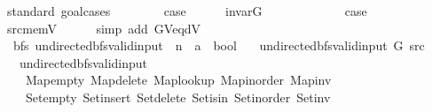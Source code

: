 \begin{isabellebody}
\isamarkupfalse%
\ {\isacharparenleft}{\kern0pt}standard{\isacharcomma}{\kern0pt}\ goal{\isacharunderscore}{\kern0pt}cases{\isacharparenright}{\kern0pt}\isanewline
\ \ \isamarkupfalse%
\ {}\isanewline
\ \ \isamarkupfalse%
\ {\isacharquery}{\kern0pt}case\isanewline
\ \ \ \ \isamarkupfalse%
\ invar{\isacharunderscore}{\kern0pt}G\isanewline
\ \ \ \ \isacommand{{\isachardot}{\kern0pt}}\isamarkupfalse%
\isanewline
{}\isamarkupfalse%
\isanewline
\ \ \isamarkupfalse%
\ {}\isanewline
\ \ \isamarkupfalse%
\ {\isacharquery}{\kern0pt}case\isanewline
\ \ \ \ \isamarkupfalse%
\ src{\isacharunderscore}{\kern0pt}mem{\isacharunderscore}{\kern0pt}V\isanewline
\ \ \ \ \isamarkupfalse%
\ {\isacharparenleft}{\kern0pt}simp\ add{\isacharcolon}{\kern0pt}\ G{\isachardot}{\kern0pt}V{\isacharunderscore}{\kern0pt}eq{\isacharunderscore}{\kern0pt}dV{\isacharparenright}{\kern0pt}\isanewline
{}\isamarkupfalse%
%
\endisatagproof
{\isafoldproof}%
%
\isadelimproof
\isanewline
%
\endisadelimproof
%
\isadeliminvisible
\isanewline
%
\endisadeliminvisible
%
\isataginvisible
{}\isamarkupfalse%
\ \isanewline
\isanewline
{}\isamarkupfalse%
\ {\isacharparenleft}{\kern0pt}\ bfs{\isacharparenright}{\kern0pt}\ undirected{\isacharunderscore}{\kern0pt}bfs{\isacharunderscore}{\kern0pt}valid{\isacharunderscore}{\kern0pt}input{\isacharprime}{\kern0pt}\ {\isacharcolon}{\kern0pt}{\isacharcolon}{\kern0pt}\ {\isachardoublequoteopen}{\isacharprime}{\kern0pt}n\ {\isasymRightarrow}\ {\isacharprime}{\kern0pt}a\ {\isasymRightarrow}\ bool{\isachardoublequoteclose}\ \isanewline
\ \ {\isachardoublequoteopen}undirected{\isacharunderscore}{\kern0pt}bfs{\isacharunderscore}{\kern0pt}valid{\isacharunderscore}{\kern0pt}input{\isacharprime}{\kern0pt}\ G\ src\ {\isasymequiv}\isanewline
\ \ \ undirected{\isacharunderscore}{\kern0pt}bfs{\isacharunderscore}{\kern0pt}valid{\isacharunderscore}{\kern0pt}input\isanewline
\ \ \ \ Map{\isacharunderscore}{\kern0pt}empty\ Map{\isacharunderscore}{\kern0pt}delete\ Map{\isacharunderscore}{\kern0pt}lookup\ Map{\isacharunderscore}{\kern0pt}inorder\ Map{\isacharunderscore}{\kern0pt}inv\isanewline
\ \ \ \ Set{\isacharunderscore}{\kern0pt}empty\ Set{\isacharunderscore}{\kern0pt}insert\ Set{\isacharunderscore}{\kern0pt}delete\ Set{\isacharunderscore}{\kern0pt}isin\ Set{\isacharunderscore}{\kern0pt}inorder\ Set{\isacharunderscore}{\kern0pt}inv\isanewline

\end{isabellebody}
